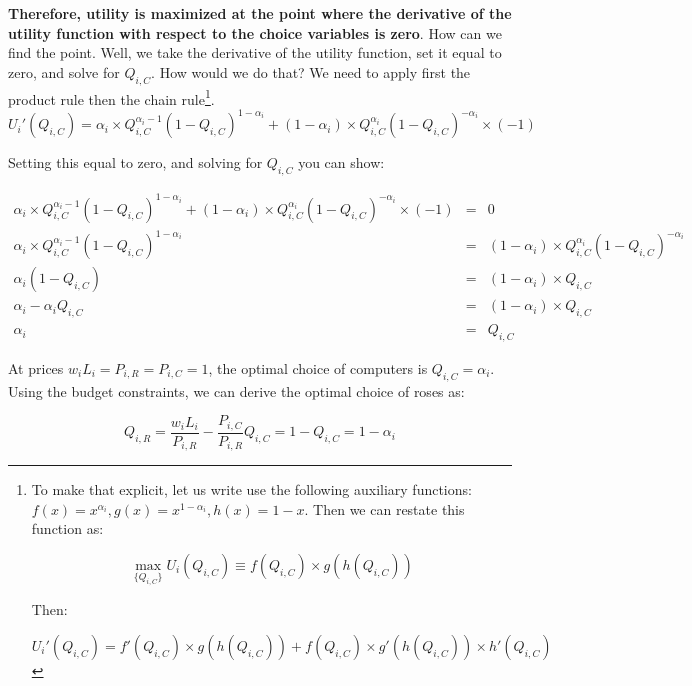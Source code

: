 \documentclass[11pt,letterpaper]{article}
\begin{document}
\textbf{Therefore, utility is maximized at the point where the derivative of the utility function with respect to the choice variables is zero}. How can we find the point. Well, we take the derivative of the utility function, set it equal to zero, and solve for $Q_{i,C}$. How would we do that? We need to apply first the product rule then the chain rule\footnote{To make that explicit, let us write use the following auxiliary functions: $f(x) = x^{\alpha_i}, g(x) = x^{1-\alpha_i}, h(x) = 1-x$. Then we can restate this function as:

\begin{equation*}
    \max_{\{Q_{i,C}\}} U_i(Q_{i,C}) \equiv f(Q_{i,C}) \times g(h(Q_{i,C}) )
\end{equation*}

Then:

\begin{equation*}
    U_i'(Q_{i,C}) = f'(Q_{i,C}) \times g(h(Q_{i,C}) ) + f(Q_{i,C}) \times g'(h(Q_{i,C}) ) \times h'(Q_{i,C})
\end{equation*}
}.
\begin{equation*}
    U_i'(Q_{i,C}) = \alpha_i \times Q_{i,C}^{\alpha_i-1} \left( 1 - Q_{i,C} \right)^{1-\alpha_i} + (1-\alpha_i) \times Q_{i,C}^{\alpha_i} \left( 1 - Q_{i,C} \right)^{-\alpha_i} \times (-1)
\end{equation*}

Setting this equal to zero, and solving for $Q_{i,C}$ you can show:

\begin{eqnarray*}
    \alpha_i \times Q_{i,C}^{\alpha_i-1} \left( 1 - Q_{i,C} \right)^{1-\alpha_i} + (1-\alpha_i) \times Q_{i,C}^{\alpha_i} \left( 1 - Q_{i,C} \right)^{-\alpha_i} \times (-1) &=& 0 \\
    \alpha_i \times Q_{i,C}^{\alpha_i-1} \left( 1 - Q_{i,C} \right)^{1-\alpha_i}  &=& (1-\alpha_i) \times Q_{i,C}^{\alpha_i} \left( 1 - Q_{i,C} \right)^{-\alpha_i}     \\
    \alpha_i \left( 1 - Q_{i,C} \right)   &=& (1-\alpha_i) \times Q_{i,C} \\     
    \alpha_i - \alpha_i Q_{i,C}   &=& (1-\alpha_i) \times Q_{i,C}      \\
    \alpha_i    &=& Q_{i,C}
\end{eqnarray*}

At prices $w_iL_i=P_{i,R}=P_{i,C}=1$, the optimal choice of computers is $Q_{i,C} = \alpha_i$. Using the budget constraints, we can derive the optimal choice of roses as:

\begin{equation*}
 Q_{i,R} = \frac{w_i L_i}{P_{i,R}} - \frac{P_{i,C}}{P_{i,R} } Q_{i,C} = 1-Q_{i,C}    = 1-\alpha_i
\end{equation*}
\end{document}
